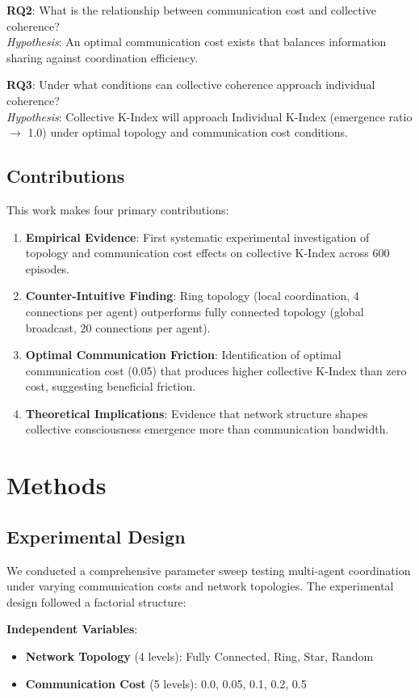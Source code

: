 \documentclass[10pt,letterpaper]{article}
\begin{document}
\textbf{RQ2}: What is the relationship between communication cost and collective coherence?\\
\textit{Hypothesis}: An optimal communication cost exists that balances information sharing against coordination efficiency.

\textbf{RQ3}: Under what conditions can collective coherence approach individual coherence?\\
\textit{Hypothesis}: Collective K-Index will approach Individual K-Index (emergence ratio $\rightarrow$ 1.0) under optimal topology and communication cost conditions.

\subsection*{Contributions}
This work makes four primary contributions:

\begin{enumerate}
\item \textbf{Empirical Evidence}: First systematic experimental investigation of topology and communication cost effects on collective K-Index across 600 episodes.
\item \textbf{Counter-Intuitive Finding}: Ring topology (local coordination, 4 connections per agent) outperforms fully connected topology (global broadcast, 20 connections per agent).
\item \textbf{Optimal Communication Friction}: Identification of optimal communication cost (0.05) that produces higher collective K-Index than zero cost, suggesting beneficial friction.
\item \textbf{Theoretical Implications}: Evidence that network structure shapes collective consciousness emergence more than communication bandwidth.
\end{enumerate}

\section*{Methods}

\subsection*{Experimental Design}
We conducted a comprehensive parameter sweep testing multi-agent coordination under varying communication costs and network topologies. The experimental design followed a factorial structure:

\textbf{Independent Variables}:
\begin{itemize}
\item \textbf{Network Topology} (4 levels): Fully Connected, Ring, Star, Random
\item \textbf{Communication Cost} (5 levels): 0.0, 0.05, 0.1, 0.2, 0.5
\end{itemize}
\end{document}
